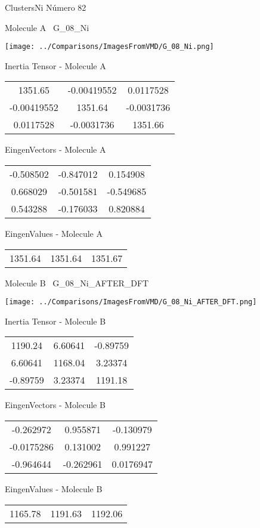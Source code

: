\vtab[-3cm]
\begin{center}
{\large ClustersNi \tab Número 82}
\end{center}
\begin{multicols}{2}
\begin{center}

Molecule A \
G\_08\_Ni

\texttt{[image: ../Comparisons/ImagesFromVMD/G\_08\_Ni.png]}

Inertia Tensor - Molecule A \\
\begin{tabular}{|c c c|}
1351.65	 & 	-0.00419552	 & 	0.0117528	 \\
-0.00419552	 & 	1351.64	 & 	-0.0031736	 \\
0.0117528	 & 	-0.0031736	 & 	1351.66
\end{tabular}

\vtab
 EingenVectors - Molecule A     \\
\begin{tabular}{|c c c|}
-0.508502	 & 	-0.847012	 & 	0.154908	 \\
0.668029	 & 	-0.501581	 & 	-0.549685	 \\
0.543288	 & 	-0.176033	 & 	0.820884
\end{tabular}

\vtab
 EingenValues - Molecule A     \\
\begin{tabular}{|c c c|}
1351.64	 & 	1351.64	 & 	1351.67	 \\
\end{tabular}
\columnbreak

Molecule B \
G\_08\_Ni\_AFTER\_DFT

\texttt{[image: ../Comparisons/ImagesFromVMD/G\_08\_Ni\_AFTER\_DFT.png]}

Inertia Tensor - Molecule B \\
\begin{tabular}{|c c c|}
1190.24	 & 	6.60641	 & 	-0.89759	 \\
6.60641	 & 	1168.04	 & 	3.23374	 \\
-0.89759	 & 	3.23374	 & 	1191.18
\end{tabular}

\vtab
 EingenVectors - Molecule B     \\
\begin{tabular}{|c c c|}
-0.262972	 & 	0.955871	 & 	-0.130979	 \\
-0.0175286	 & 	0.131002	 & 	0.991227	 \\
-0.964644	 & 	-0.262961	 & 	0.0176947
\end{tabular}

\vtab
 EingenValues - Molecule B     \\
\begin{tabular}{|c c c|}
1165.78	 & 	1191.63	 & 	1192.06	 \\
\end{tabular}

\end{center}
\end{multicols}

